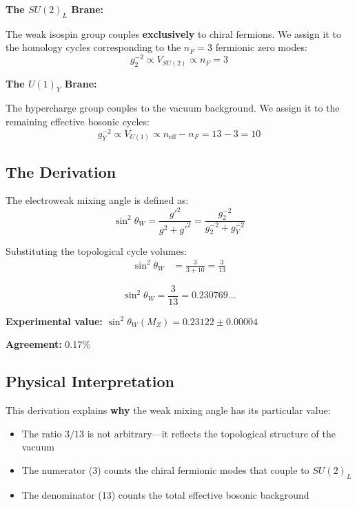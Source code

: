 \documentclass[12pt,a4paper]{article}
\newcommand{\sinW}{\sin^2\theta_W}
\newcommand{\nF}{n_F}
\begin{document}
\textbf{The $SU(2)_L$ Brane:}

The weak isospin group couples \textbf{exclusively} to chiral fermions. We assign it to the homology cycles corresponding to the $\nF = 3$ fermionic zero modes:
\begin{equation}
g_2^{-2} \propto V_{SU(2)} \propto \nF = 3
\end{equation}

\textbf{The $U(1)_Y$ Brane:}

The hypercharge group couples to the vacuum background. We assign it to the remaining effective bosonic cycles:
\begin{equation}
g_Y^{-2} \propto V_{U(1)} \propto n_{\text{eff}} - \nF = 13 - 3 = 10
\end{equation}

\subsection{The Derivation}

The electroweak mixing angle is defined as:
\begin{equation}
\sinW = \frac{g'^2}{g^2 + g'^2} = \frac{g_2^{-2}}{g_2^{-2} + g_Y^{-2}}
\end{equation}

Substituting the topological cycle volumes:
\begin{align}
\sinW &= \frac{3}{3 + 10} = \frac{3}{13}
\end{align}

\begin{equation}
\boxed{\sinW = \frac{3}{13} = 0.230769...}
\end{equation}

\textbf{Experimental value:} $\sinW(M_Z) = 0.23122 \pm 0.00004$

\textbf{Agreement:} 0.17\%

\subsection{Physical Interpretation}

This derivation explains \textbf{why} the weak mixing angle has its particular value:
\begin{itemize}
    \item The ratio $3/13$ is not arbitrary---it reflects the topological structure of the vacuum
    \item The numerator (3) counts the chiral fermionic modes that couple to $SU(2)_L$
    \item The denominator (13) counts the total effective bosonic background
\end{itemize}
\end{document}
